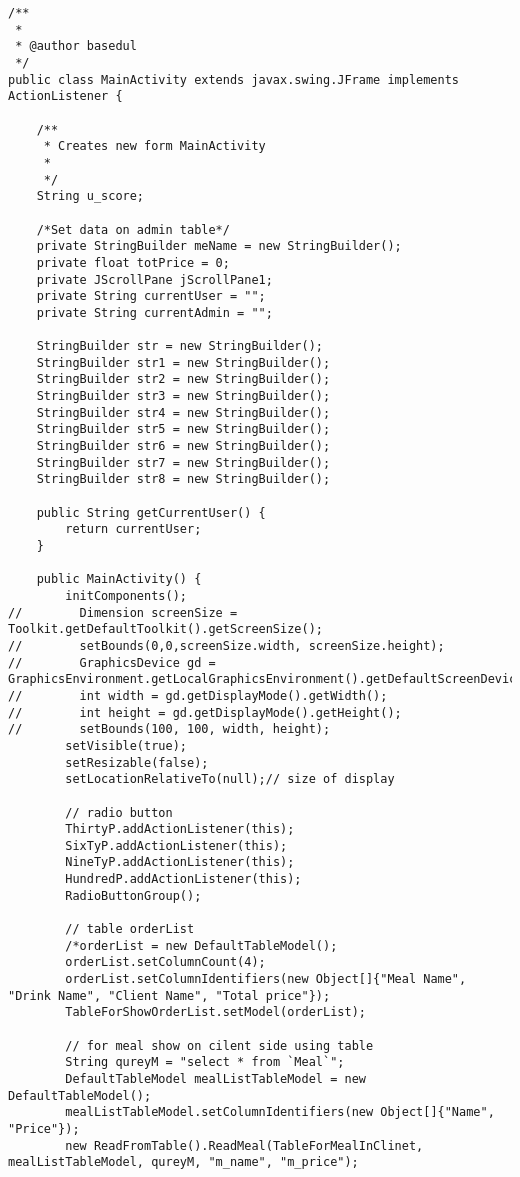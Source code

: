 \documentclass[12pt,a4paper]{article}
\begin{document}
\begin{lstlisting}
/**
 *
 * @author basedul
 */
public class MainActivity extends javax.swing.JFrame implements ActionListener {

    /**
     * Creates new form MainActivity
     *
     */
    String u_score;

    /*Set data on admin table*/
    private StringBuilder meName = new StringBuilder();
    private float totPrice = 0;
    private JScrollPane jScrollPane1;
    private String currentUser = "";
    private String currentAdmin = "";

    StringBuilder str = new StringBuilder();
    StringBuilder str1 = new StringBuilder();
    StringBuilder str2 = new StringBuilder();
    StringBuilder str3 = new StringBuilder();
    StringBuilder str4 = new StringBuilder();
    StringBuilder str5 = new StringBuilder();
    StringBuilder str6 = new StringBuilder();
    StringBuilder str7 = new StringBuilder();
    StringBuilder str8 = new StringBuilder();

    public String getCurrentUser() {
        return currentUser;
    }

    public MainActivity() {
        initComponents();
//        Dimension screenSize = Toolkit.getDefaultToolkit().getScreenSize();
//        setBounds(0,0,screenSize.width, screenSize.height);
//        GraphicsDevice gd = GraphicsEnvironment.getLocalGraphicsEnvironment().getDefaultScreenDevice();
//        int width = gd.getDisplayMode().getWidth();
//        int height = gd.getDisplayMode().getHeight();
//        setBounds(100, 100, width, height);
        setVisible(true);
        setResizable(false);
        setLocationRelativeTo(null);// size of display

        // radio button
        ThirtyP.addActionListener(this);
        SixTyP.addActionListener(this);
        NineTyP.addActionListener(this);
        HundredP.addActionListener(this);
        RadioButtonGroup();

        // table orderList
        /*orderList = new DefaultTableModel();
        orderList.setColumnCount(4);
        orderList.setColumnIdentifiers(new Object[]{"Meal Name", "Drink Name", "Client Name", "Total price"});
        TableForShowOrderList.setModel(orderList);

        // for meal show on cilent side using table
        String qureyM = "select * from `Meal`";
        DefaultTableModel mealListTableModel = new DefaultTableModel();
        mealListTableModel.setColumnIdentifiers(new Object[]{"Name", "Price"});
        new ReadFromTable().ReadMeal(TableForMealInClinet, mealListTableModel, qureyM, "m_name", "m_price");


\end{lstlisting}
\end{document}
